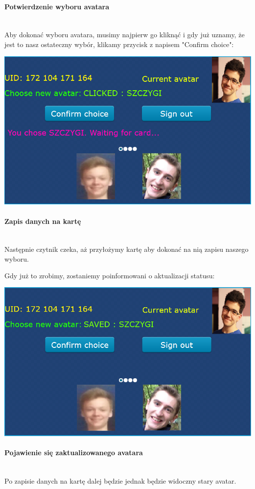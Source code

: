 \documentclass[12pt,hidelinks]{article}
\newcommand{\subsubsubsection}[1]{\paragraph{#1}\mbox{}\\}
\begin{document}
    \subsubsubsection{Potwierdzenie wyboru avatara}

    Aby dokonać wyboru avatara, musimy najpierw go kliknąć i gdy już uznamy, że jest to nasz ostateczny wybór, klikamy przycisk z napisem "Confirm choice":

    \begin{center}
        \includegraphics[scale=0.75]{img/screen2-choice-confirmed.png}
    \end{center}

    \subsubsubsection{Zapis danych na kartę}
    Następnie czytnik czeka, aż przyłożymy kartę aby dokonać na nią zapisu naszego wyboru.

    Gdy już to zrobimy, zostaniemy poinformowani o aktualizacji statusu:

    \begin{center}
        \includegraphics[scale=0.75]{img/screen2-saved.png}
    \end{center}

    \newpage
    \subsubsubsection{Pojawienie się zaktualizowanego avatara}
    Po zapisie danych na kartę dalej będzie jednak będzie widoczny stary avatar.
\end{document}
